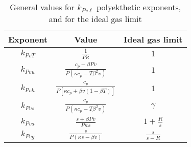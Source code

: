     \begin{table}[ht]
        \centering
        \caption{General values for $k_{Pv\ell}$ polyekthetic exponents, and for the ideal gas limit}
        \vspace{4pt}
        \begin{tabular}{ccc}
            \toprule
            Exponent    & Value     &
            Ideal gas limit \\
            \midrule
            $k_{PvT}$   &
            \(\displaystyle\frac{1}{P\kappa}\) &
            $1$ \\[\bigskipamount]
            $k_{Pvu}$   &
            \(\displaystyle\frac{c_p - \beta Pv}{P(\kappa c_p - T\beta^2v)}\) &
            $1$ \\[\bigskipamount]
            $k_{Pvh}$   &
            \(\displaystyle\frac{c_p}{P[\kappa c_p + \beta v(1 - \beta T)]}\) &
            $1$ \\[\bigskipamount]
            $k_{Pvs}$   &
            \(\displaystyle\frac{c_p}{P(\kappa c_p - T\beta^2v)}\) &
            $\gamma$ \\[\bigskipamount]
            $k_{Pva}$   &
            \(\displaystyle\frac{s + \beta Pv}{P\kappa s}\) &
            \(\displaystyle 1 + \frac{R}{s}\) \\[\bigskipamount]
            $k_{Pvg}$   &
            \(\displaystyle\frac{s}{P(\kappa s - \beta v)}\) &
            \(\displaystyle\frac{s}{s - R}\) \\[\bigskipamount]
            \bottomrule
        \end{tabular}
        \label{tab:kPv}
    \end{table}


